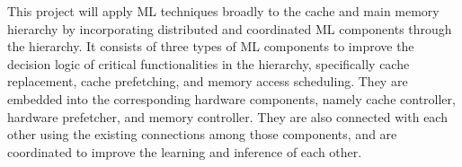 

%
%
%


This project will apply ML techniques broadly to the cache and main memory
hierarchy by incorporating distributed and coordinated ML components through the
hierarchy.  It consists of three types of ML components to improve the decision
logic of critical functionalities in the hierarchy, specifically cache
replacement, cache prefetching, and memory access scheduling.  They are embedded
into the corresponding hardware components, namely cache controller, hardware
prefetcher, and memory controller.  They are also connected with each other
using the existing connections among those components, and are coordinated to
improve the learning and inference of each other.

